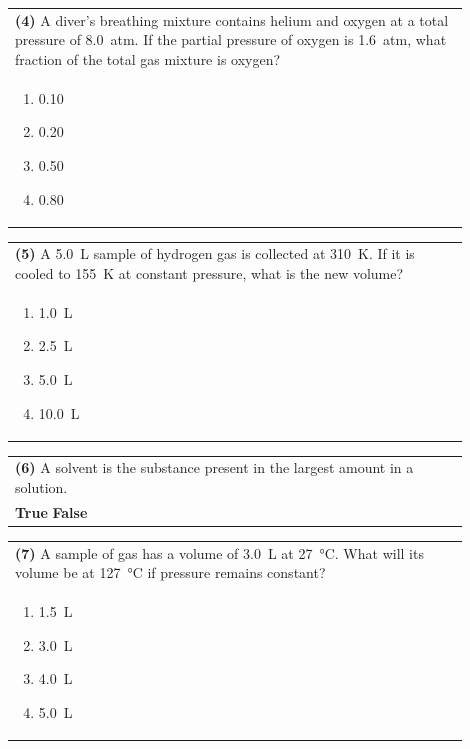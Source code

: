 \documentclass{article}
\begin{document}
{{\vspace{0.2cm}
\noindent\begin{tabular}{|p{0.9\linewidth}|}
\hline
\textbf{(4)} A diver's breathing mixture contains helium and oxygen at a total pressure of 8.0~atm. If the partial pressure of oxygen is 1.6~atm, what fraction of the total gas mixture is oxygen?\\[0.2cm]
\begin{minipage}[t]{0.85\linewidth}
\begin{enumerate}[label=\alph*.]
\item 0.10
\item 0.20
\item 0.50
\item 0.80
\end{enumerate}
\end{minipage}\\[0.2cm]
\hline
\end{tabular}
\newpage

\vspace{0.2cm}
\noindent\begin{tabular}{|p{0.9\linewidth}|}
\hline
\textbf{(5)} A 5.0~L sample of hydrogen gas is collected at 310~K. If it is cooled to 155~K at constant pressure, what is the new volume?\\[0.2cm]
\begin{minipage}[t]{0.85\linewidth}
\begin{enumerate}[label=\alph*.]
\item 1.0~L
\item 2.5~L
\item 5.0~L
\item 10.0~L
\end{enumerate}
\end{minipage}\\[0.2cm]
\hline
\end{tabular}

\noindent\begin{tabular}{|p{0.9\linewidth}|}
\hline
\textbf{(6)} A solvent is the substance present in the largest amount in a solution.\\[0.2cm]
\textbf{True} \hspace{1cm} \textbf{False}\\[0.2cm]
\hline
\end{tabular}

\vspace{0.2cm}
\noindent\begin{tabular}{|p{0.9\linewidth}|}
\hline
\textbf{(7)} A sample of gas has a volume of 3.0~L at 27~°C. What will its volume be at 127~°C if pressure remains constant?\\[0.2cm]
\begin{minipage}[t]{0.85\linewidth}
\begin{enumerate}[label=\alph*.]
\item 1.5~L
\item 3.0~L
\item 4.0~L
\item 5.0~L
\end{enumerate}
\end{minipage}\\[0.2cm]
\hline
\end{tabular}

}}
\end{document}

